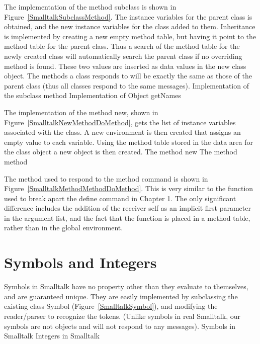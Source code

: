 The implementation of the method {\sf subclass} is shown in
Figure~\ref{SmalltalkSubclassMethod}.  The instance variables for the parent
class is obtained, and the new instance variables for the class added to them.
Inheritance is implemented by creating a new empty method table, but having it
point to the method table for the parent class.  Thus a search of the method
table for the newly created class will automatically search the parent class if
no overriding method is found.  These two values are inserted as data values in
the new class object.  The methods a class responds to will be exactly the same
as those of the parent class (thus all classes respond to the same messages).
%
{Implementation of the {\sf subclass} method}
%
{Implementation of Object getNames}

The implementation of the method {\sf new}, shown in
Figure~\ref{SmalltalkNewMethodDoMethod}, gets the list of instance variables
associated with the class.  A new environment is then created that assigns an
empty value to each variable.  Using the method table stored in the data area
for the class object a new object is then created.
%
{The method {\sf new}}
%
{The method {\sf method}}

The method used to respond to the {\sf method} command is shown in
Figure~\ref{SmalltalkMethodMethodDoMethod}.  This is very similar to the
function used to break apart the {\sf define} command in Chapter 1.  The only
significant difference includes the addition of the receiver {\sf self} as an
implicit first parameter in the argument list, and the fact that the function is
placed in a method table, rather than in the global environment.

\section{Symbols and Integers}

Symbols in Smalltalk have no property other than they evaluate to themselves,
and are guaranteed unique.  They are easily implemented by subclassing the
existing class {\sf Symbol} (Figure~\ref{SmalltalkSymbol}), and modifying the
reader/parser to recognize the tokens.  (Unlike symbols in real Smalltalk, our
symbols are not objects and will not respond to any messages).
%
{Symbols in Smalltalk}
%
{Integers in Smalltalk}

